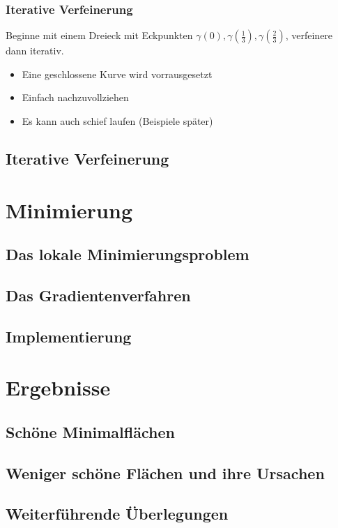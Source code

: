 \documentclass{beamer}
\begin{document}
\begin{frame}
	\frametitle{Iterative Verfeinerung}
	Beginne mit einem Dreieck mit Eckpunkten $\gamma(0), \gamma(\frac 13), \gamma(\frac 23)$, verfeinere dann iterativ.
	\begin{itemize}
		\item
			Eine geschlossene Kurve wird vorrausgesetzt
		\item
			Einfach nachzuvollziehen
		\item
			Es kann auch schief laufen (Beispiele später)
	\end{itemize}
\end{frame}

\subsection{Iterative Verfeinerung}


\section{Minimierung}

\subsection{Das lokale Minimierungsproblem}

\subsection{Das Gradientenverfahren}

\subsection{Implementierung}


\section{Ergebnisse}

\subsection{Schöne Minimalflächen}

\subsection{Weniger schöne Flächen und ihre Ursachen}

\subsection{Weiterführende Überlegungen}
\end{document}
